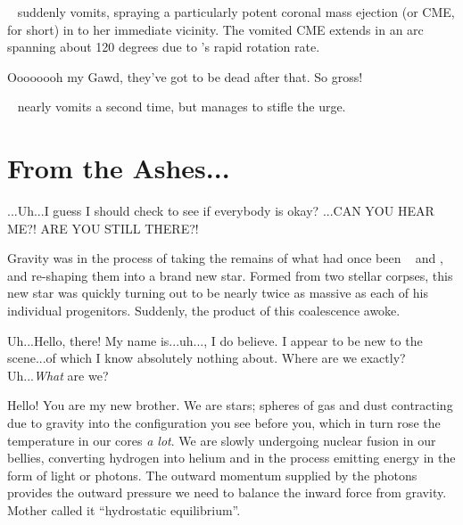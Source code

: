 \documentclass[main.tex]{subfiles}
\begin{document}
\par \nar \rmcelaeno~ suddenly vomits, spraying a particularly potent coronal mass ejection (or CME, for short) in to her immediate vicinity.  The vomited CME extends in an arc spanning about 120 degrees due to \rmcelaeno's rapid rotation rate.

\par \Celaeno Oooooooh my Gawd, they've got to be dead after that.  So gross!  

\par \nar \rmcelaeno~ nearly vomits a second time, but manages to stifle the urge.

\section{From the Ashes...} 

\par \Celaeno ...Uh...I guess I should check to see if everybody is okay? ...CAN YOU HEAR ME?!  ARE YOU STILL THERE?! 

\par \nar Gravity was in the process of taking the remains of what had once been \rmtaygete~ and \rmalcyone, and re-shaping them into a brand new star.  Formed from two stellar corpses, this new star was quickly turning out to be nearly twice as massive as each of his individual progenitors.  Suddenly, the product of this coalescence awoke.


\par \Lacedaemon Uh...Hello, there!  My name is...uh...\rmlacedaemon, I do believe.  I appear to be new to the scene...of which I know absolutely nothing about.  Where are we exactly?  Uh...\textit{What} are we?

\par \Celaeno Hello!  You are my new brother.  We are stars; spheres of gas and dust contracting due to gravity into the configuration you see before you, which in turn rose the temperature in our cores \textit{a lot}.  We are slowly undergoing nuclear fusion in our bellies, converting hydrogen into helium and in the process emitting energy in the form of light or photons.  The outward momentum supplied by the photons provides the outward pressure we need to balance the inward force from gravity.  Mother called it ``hydrostatic equilibrium''.
\end{document}
